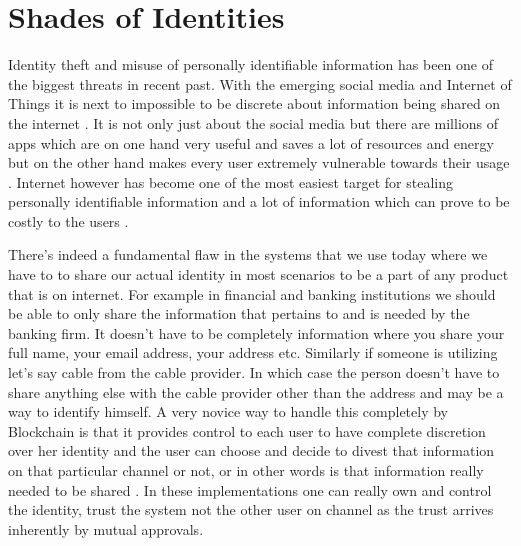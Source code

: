 \section{Shades of Identities}
Identity theft and misuse of personally identifiable information has been one of the biggest threats in recent past. With the emerging social media and Internet of Things it is next to impossible to be discrete about information being shared on the internet \cite{reuters20}. It is not only just about the social media but there are millions of apps which are on one hand very useful and saves a lot of resources and energy but on the other hand makes every user extremely vulnerable towards their usage \cite{statista21}. Internet however has become one of the most easiest target for stealing personally identifiable information and a lot of information which can prove to be costly to the users \cite{hedayati22}.

There's indeed a fundamental flaw in the systems that we use today where we have to to share our actual identity in most scenarios to be a part of any product that is on internet. For example in financial and banking institutions we should be able to only share the information that pertains to and is needed by the banking firm. It doesn't have to be completely information where you share your full name, your email address, your address etc. Similarly if someone is utilizing let's say cable from the cable provider. In which case the person doesn't have to share anything else with the cable provider other than the address and may be a way to identify himself. A very novice way to handle this completely by Blockchain is that it provides control to each user to have complete discretion over her identity and the user can choose and decide to divest that information on that particular channel or not, or in other words is that information really needed to be shared \cite{alex23}. In these implementations one can really own and control the identity, trust the system not the other user on channel as the trust arrives inherently by mutual approvals.


